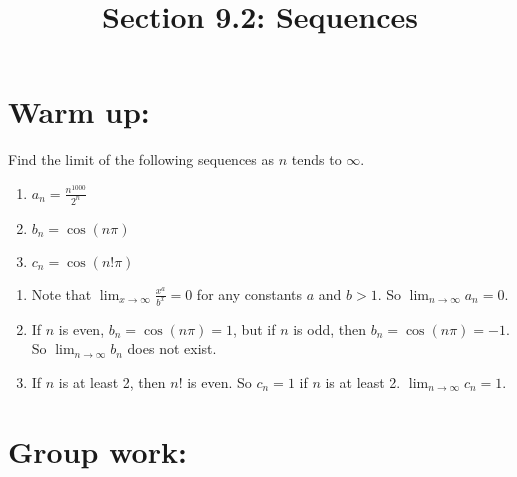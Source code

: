 \documentclass[handout]{ximera}
\title{Section 9.2: Sequences}
\begin{document}
\begin{abstract}		\end{abstract}
\maketitle



\section{Warm up:}
Find the limit of the following sequences as $n$ tends to $\infty$. 
\begin{enumerate}

\item $a_n = \frac{n^{1000}}{2^n}$

	
\item $b_n = \cos (n \pi)$

\item $c_n = \cos (n! \pi)$

\end{enumerate}
	\begin{freeResponse}
\begin{enumerate}	
\item Note that $\lim_{x \to \infty} \frac{x^a}{b^x} = 0$ for any constants $a$ and $b>1$. So $\lim_{n \to \infty} a_n =0$.
\item If $n$ is even, $b_n = \cos(n \pi) = 1$, but if $n$ is odd, then $b_n = \cos(n \pi) = -1$. So $\lim_{n \to \infty} b_n$ does not exist.
\item If $n$ is at least 2, then $n!$ is even. So $c_n = 1$ if $n$ is at least 2. $\lim_{n \to \infty} c_n = 1$. 
\end{enumerate}
	\end{freeResponse}
\begin{instructorNotes}

\end{instructorNotes}







\section{Group work:}
\end{document}
